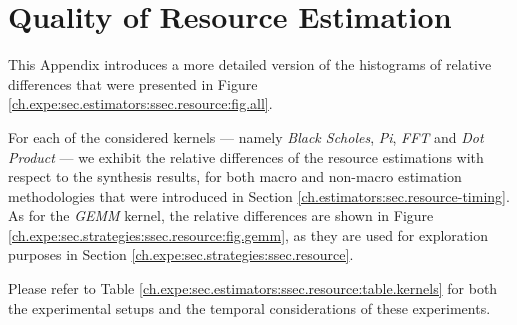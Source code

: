 \chapter{Quality of Resource Estimation}

This Appendix introduces a more detailed version of the histograms of relative differences that were presented in Figure \ref{ch.expe:sec.estimators:ssec.resource:fig.all}.

For each of the considered kernels --- namely {\it Black Scholes}, {\it Pi}, {\it FFT} and {\it Dot Product} --- we exhibit the relative differences of the resource estimations with respect to the synthesis results, for both macro and non-macro estimation methodologies that were introduced in Section \ref{ch.estimators:sec.resource-timing}.
As for the {\it GEMM} kernel, the relative differences are shown in Figure \ref{ch.expe:sec.strategies:ssec.resource:fig.gemm}, as they are used for exploration purposes in Section \ref{ch.expe:sec.strategies:ssec.resource}.

Please refer to Table \ref{ch.expe:sec.estimators:ssec.resource:table.kernels} for both the experimental setups and the temporal considerations of these experiments.

\vspace*{\fill}
\minilof

\clearpage

\clearpage

